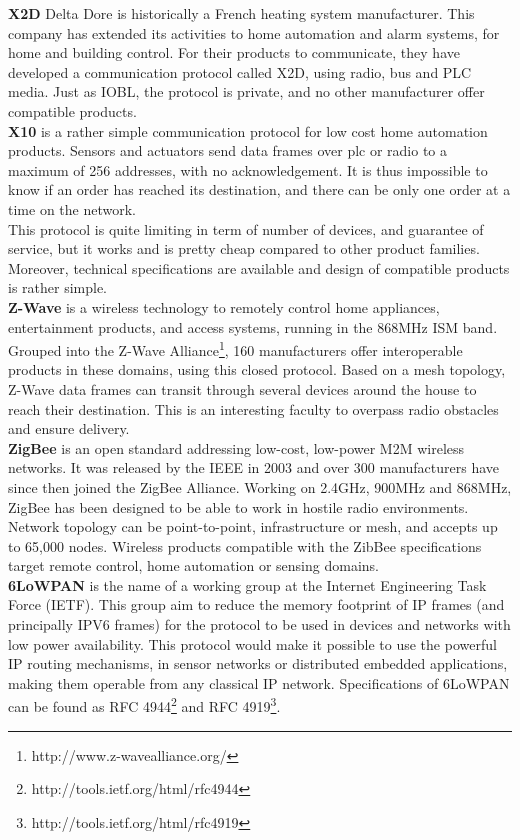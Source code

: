 {\bf X2D} Delta Dore is historically a French heating system manufacturer. This company has extended its activities to home automation and alarm systems, for home and building control. For their products to communicate, they have developed a communication protocol called X2D, using radio, bus and PLC media. Just as IOBL, the protocol is private, and no other manufacturer offer compatible products.\\

{\bf X10} is a rather simple communication protocol for low cost home automation products. Sensors and actuators send data frames over \gls{plc} or radio to a maximum of 256 addresses, with no acknowledgement. It is thus impossible to know if an order has reached its destination, and there can be only one order at a time on the network.\\
This protocol is quite limiting in term of number of devices, and guarantee of service, but it works and is pretty cheap compared to other product families. Moreover, technical specifications are available and design of compatible products is rather simple.\\

{\bf Z-Wave} is a wireless technology to remotely control home appliances, entertainment products, and access systems, running in the 868MHz ISM band. Grouped into the Z-Wave Alliance\footnote{http://www.z-wavealliance.org/}, 160 manufacturers offer interoperable products in these domains, using this closed protocol. Based on a mesh topology, Z-Wave data frames can transit through several devices around the house to reach their destination. This is an interesting faculty to overpass radio obstacles and ensure delivery.\\
 
{\bf ZigBee} is an open standard addressing low-cost, low-power M2M wireless networks. It was released by the IEEE in 2003 and over 300 manufacturers have since then joined the ZigBee Alliance. Working on 2.4GHz, 900MHz and 868MHz, ZigBee has been designed to be able to work in hostile radio environments. Network topology can be point-to-point, infrastructure or mesh, and accepts up to 65,000 nodes. Wireless products compatible with the ZibBee specifications target remote control, home automation or sensing domains.\\

{\bf 6LoWPAN} is the name of a working group at the Internet Engineering Task Force (IETF). This group aim to reduce the memory footprint of IP frames (and principally IPV6 frames) for the protocol to be used in devices and networks with low power availability. This protocol would make it possible to use the powerful IP routing mechanisms, in sensor networks or distributed embedded applications, making them operable from any classical IP network. Specifications of 6LoWPAN can be found as RFC 4944\footnote{http://tools.ietf.org/html/rfc4944} and RFC 4919\footnote{http://tools.ietf.org/html/rfc4919}.\\


